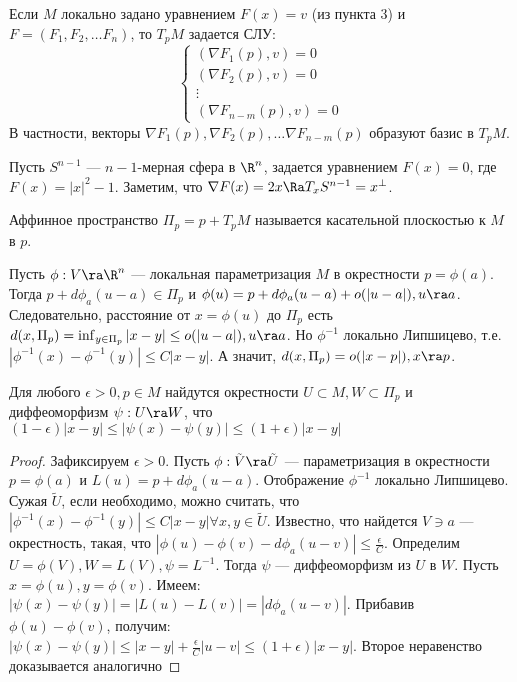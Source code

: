 \begin{corollary}
    Если \(M\) локально задано уравнением \(F(x) = v\) (из пункта 3) и \(F = (F_1, F_2, \dots F_n)\), то \(T_pM\) задается СЛУ:
    \begin{equation*}
        \begin{cases*}
            (\nabla F_1(p), v) = 0 \\
            (\nabla F_2(p), v) = 0 \\
            \vdots \\
            (\nabla F_{n - m}(p), v) = 0
        \end{cases*}
    \end{equation*}
    В частности, векторы \(\nabla F_1(p), \nabla F_2(p), \dots \nabla F_{n - m}(p)\) образуют базис в \(T_pM\).
\end{corollary}

\begin{example}
    Пусть \(S^{n - 1}\) --- \(n-1\)-мерная сфера в \(\R^n\), задается уравнением \(F(x) = 0\), где \(F(x) = |x|^2 - 1\). Заметим, что \(\nabla F(x) = 2x \Ra T_xS^{n - 1} = x^{\perp}\).
\end{example}

\begin{definition}
    Аффинное пространство \(\Pi_p = p + T_pM\) называется касательной плоскостью к \(M\) в \(p\).
\end{definition}

Пусть \(\phi: V \ra \R^n\) --- локальная параметризация \(M\) в окрестности \(p = \phi(a)\). Тогда \(p + d\phi_a(u - a) \in \Pi_p\) и \(\phi(u) = p + d\phi_a(u - a) + o(|u - a|), u \ra a\). Следовательно, расстояние от \(x = \phi(u)\) до \(\Pi_p\) есть \(d(x, \Pi_p) = \inf_{y \in \Pi_p} |x - y| \le o(|u - a|), u \ra a\). Но \(\phi^{-1}\) локально Липшицево, т.е. \(|\phi^{-1}(x) - \phi^{-1}(y)| \le C|x - y|\). А значит, \(d(x, \Pi_p) = o(|x - p|), x \ra p\).

\begin{lemma}
    Для любого \(\epsilon > 0, p \in M\) найдутся окрестности \(U \subset M, W \subset \Pi_p\) и диффеоморфизм \(\psi: U \ra W\), что \((1 - \epsilon)|x - y| \le |\psi(x) - \psi(y)| \le (1 + \epsilon)|x - y|\)
\end{lemma}
\begin{proof}
    Зафиксируем \(\epsilon > 0\). Пусть \(\phi: \tilde{V} \ra \tilde{U}\) --- параметризация в окрестности \(p = \phi(a)\) и \(L(u) = p + d\phi_a(u - a)\). Отображение \(\phi^{-1}\) локально Липшицево. Сужая \(\tilde{U}\), если необходимо, можно считать, что \(|\phi^{-1}(x) - \phi^{-1}(y)| \le C|x - y| \forall x, y \in \tilde{U}\). Известно, что найдется \(V \ni a\) --- окрестность, такая, что \(|\phi(u) - \phi(v) - d\phi_a(u - v)| \le \frac{\epsilon}{C}\). Определим \(U = \phi(V), W = L(V), \psi = L^{-1}\). Тогда \(\psi\) --- диффеоморфизм из \(U\) в \(W\). Пусть \(x = \phi(u), y = \phi(v)\). Имеем: \(|\psi(x) - \psi(y)| = |L(u) - L(v)| = |d\phi_a(u - v)|\). Прибавив \(\phi(u) - \phi(v)\), получим: \(|\psi(x) - \psi(y)| \le |x - y| + \frac{\epsilon}{C}|u - v| \le (1 + \epsilon)|x - y|\). Второе неравенство доказывается аналогично
\end{proof}

